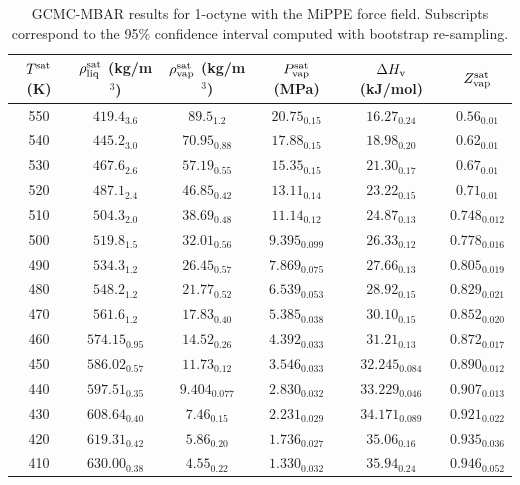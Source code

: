 \documentclass[journal=jctc,manuscript=article]{achemso}
\begin{document}
\begin{table}[htb!]
	\caption{GCMC-MBAR results for 1-octyne with the MiPPE force field. Subscripts correspond to the 95\% confidence interval computed with bootstrap re-sampling.}
	\begin{center}
		\begin{tabular}{|c|c|c|c|c|c|}
			\hline
			$T^{\rm sat}$ (K) & $\rho_{\rm liq}^{\rm sat}$ (kg/m$^3$) & $\rho_{\rm vap}^{\rm sat}$ (kg/m$^3$) & $P_{\rm vap}^{\rm sat}$ (MPa) & $\Delta H_{\rm v}$ (kJ/mol) & $Z_{\rm vap}^{\rm sat}$ \\ \hline
			550 & $419.4_{3.6}$ & $89.5_{1.2}$ & $20.75_{0.15}$ & $16.27_{0.24}$ & $0.56_{0.01}$ \\
			540 & $445.2_{3.0}$ & $70.95_{0.88}$ & $17.88_{0.15}$ & $18.98_{0.20}$ & $0.62_{0.01}$ \\
			530 & $467.6_{2.6}$ & $57.19_{0.55}$ & $15.35_{0.15}$ & $21.30_{0.17}$ & $0.67_{0.01}$ \\
			520 & $487.1_{2.4}$ & $46.85_{0.42}$ & $13.11_{0.14}$ & $23.22_{0.15}$ & $0.71_{0.01}$ \\
			510 & $504.3_{2.0}$ & $38.69_{0.48}$ & $11.14_{0.12}$ & $24.87_{0.13}$ & $0.748_{0.012}$ \\
			500 & $519.8_{1.5}$ & $32.01_{0.56}$ & $9.395_{0.099}$ & $26.33_{0.12}$ & $0.778_{0.016}$ \\
			490 & $534.3_{1.2}$ & $26.45_{0.57}$ & $7.869_{0.075}$ & $27.66_{0.13}$ & $0.805_{0.019}$ \\
			480 & $548.2_{1.2}$ & $21.77_{0.52}$ & $6.539_{0.053}$ & $28.92_{0.15}$ & $0.829_{0.021}$ \\
			470 & $561.6_{1.2}$ & $17.83_{0.40}$ & $5.385_{0.038}$ & $30.10_{0.15}$ & $0.852_{0.020}$ \\
			460 & $574.15_{0.95}$ & $14.52_{0.26}$ & $4.392_{0.033}$ & $31.21_{0.13}$ & $0.872_{0.017}$ \\
			450 & $586.02_{0.57}$ & $11.73_{0.12}$ & $3.546_{0.033}$ & $32.245_{0.084}$ & $0.890_{0.012}$ \\
			440 & $597.51_{0.35}$ & $9.404_{0.077}$ & $2.830_{0.032}$ & $33.229_{0.046}$ & $0.907_{0.013}$ \\
			430 & $608.64_{0.40}$ & $7.46_{0.15}$ & $2.231_{0.029}$ & $34.171_{0.089}$ & $0.921_{0.022}$ \\
			420 & $619.31_{0.42}$ & $5.86_{0.20}$ & $1.736_{0.027}$ & $35.06_{0.16}$ & $0.935_{0.036}$ \\
			410 & $630.00_{0.38}$ & $4.55_{0.22}$ & $1.330_{0.032}$ & $35.94_{0.24}$ & $0.946_{0.052}$ \\
			\hline
		\end{tabular}
	\end{center}
\end{table}
\end{document}
